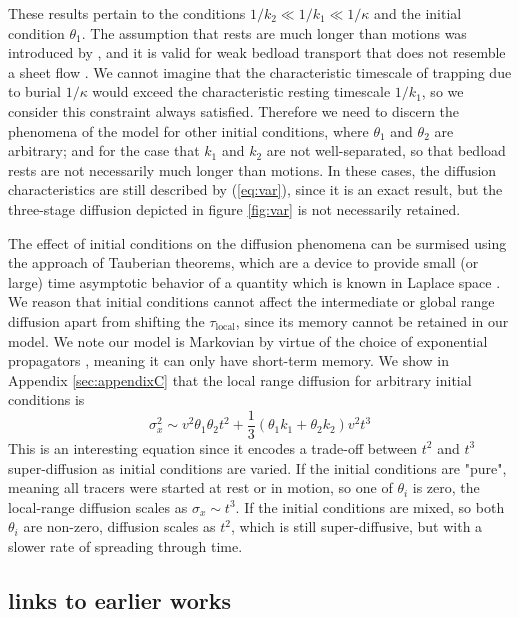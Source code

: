 \documentclass[]{agujournal2018}
\newcommand\be{\begin{equation}}
\newcommand\ee{\end{equation}}
\begin{document}
These results pertain to the conditions $1/k_2 \ll 1/k_1 \ll 1/\kappa$ and the initial condition $\theta_1$.
The assumption that rests are much longer than motions was introduced by \citet{Einstein1937}, and it is valid for weak bedload transport that does not resemble a sheet flow \citep{Frey2014}.
We cannot imagine that the characteristic timescale of trapping due to burial $1/\kappa$ would exceed the characteristic resting timescale $1/k_1$, so we consider this constraint always satisfied.
Therefore we need to discern the phenomena of the model for other initial conditions, where $\theta_1 $ and $\theta_2$ are arbitrary; and for the case that $k_1$ and $k_2$ are not well-separated, so that bedload rests are not necessarily much longer than motions.
In these cases, the diffusion characteristics are still described by (\ref{eq:var}), since it is an exact result, but the three-stage diffusion depicted in figure \ref{fig:var} is not necessarily retained.

The effect of initial conditions on the diffusion phenomena can be surmised using the approach of Tauberian theorems, which are a device to provide small (or large) time asymptotic behavior of a quantity which is known in Laplace space \citep[e.g.][]{Weiss1994}.
We reason that initial conditions cannot affect the intermediate or global range diffusion apart from shifting the $\tau_\text{local}$, since its memory cannot be retained in our model.
We note our model is Markovian by virtue of the choice of exponential propagators \citep{Weiss1994}, meaning it can only have short-term memory.
We show in Appendix \ref{sec:appendixC} that the local range diffusion for arbitrary initial conditions is 
\be \sigma_x^2 \sim v^2 \theta_1 \theta_2 t^2  + \frac{1}{3}(\theta_1 k_1 + \theta_2 k_2)v^2t^3\ee
This is an interesting equation since it encodes a trade-off between $t^2$ and $t^3$ super-diffusion as initial conditions are varied.
If the initial conditions are "pure", meaning all tracers were started at rest or in motion, so one of $\theta_i$ is zero, the local-range diffusion scales as $\sigma_x \sim t^3.$
If the initial conditions are mixed, so both $\theta_i$ are non-zero, diffusion scales as $t^2$, which is still super-diffusive, but with a slower rate of spreading through time.

\subsection{links to earlier works}
\end{document}
